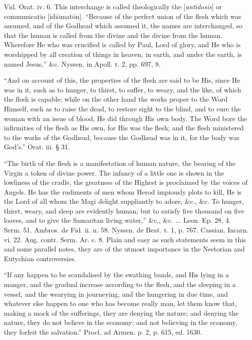 Vid. Orat. iv. 6. This interchange is called
theologically the [\emph{antidosis}] or communicatio [idi\={o}mat\={o}n].
``Because of the perfect union of the flesh which was assumed, and of
the Godhead which assumed it, the names are interchanged, so that the
human is called from the divine and the divine from the human.
Wherefore He who was crucified is called by Paul, Lord of glory, and
He who is worshipped by all creation of things in heaven, in earth,
and under the earth, is named Jesus,'' \&c. Nyssen. in Apoll. t. 2,
pp. 697, 8.

``And on account of this, the properties of the
flesh are said to be His, since He was in it, such as to hunger, to
thirst, to suffer, to weary, and the like, of which the flesh is
capable; while on the other hand the works proper to the Word Himself,
such as to raise the dead, to restore sight to the blind, and to cure
the woman with an issue of blood, He did through His own body. The
Word bore the infirmities of the flesh as His own, for His was
the flesh; and the flesh ministered to the works of the Godhead,
because the Godhead was in it, for the body was God's.'' Orat. iii. §
31.

``The birth of the flesh is a manifestation of
human nature, the bearing of the Virgin a token of divine power. The
infancy of a little one is shown in the lowliness of the cradle, the
greatness of the Highest is proclaimed by the voices of Angels. He has
the rudiments of men whom Herod impiously plots to kill, He is the
Lord of all whom the Magi delight suppliantly to adore, \&c.,
\&c. To hunger, thirst, weary, and sleep are evidently human; but
to satisfy five thousand on five loaves, and to give the Samaritan
living water,'' \&c., \&c. ... Leon. Ep. 28, 4. Serm. 51. Ambros.
de Fid. ii. n. 58. Nyssen. de Beat. t. 1, p. 767. Cassian. Incarn. vi.
22. Aug. contr. Serm. Ar. c. 8. Plain and easy as such statements seem
in this and some parallel notes, they are of the utmost importance in
the Nestorian and Eutychian controversies.

``If any happen to be scandalised by the swathing
bands, and His lying in a manger, and the gradual increase according
to the flesh, and the sleeping in a vessel, and the wearying in
journeying, and the hungering in due time, and whatever else happen to
one who has become really man, let them know that, making a mock of
the sufferings, they are denying the nature; and denying the nature,
they do not believe in the economy; and not believing in the economy,
they forfeit the salvation.'' Procl. ad Armen. p. 2, p. 615, ed. 1630.

